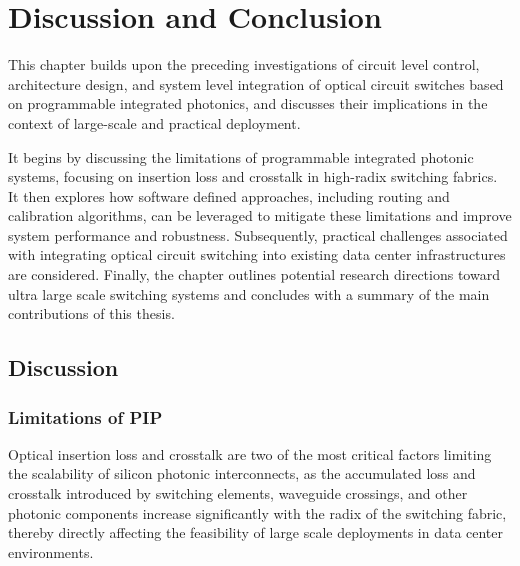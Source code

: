 
\chapter{Discussion and Conclusion}\label{chap:discussion_and_conclusions} %
This chapter builds upon the preceding investigations of circuit level control, architecture design, and system level integration of optical circuit switches based on programmable integrated photonics, and discusses their implications in the context of large-scale and practical deployment.

It begins by discussing the limitations of programmable integrated photonic systems, focusing on insertion loss and crosstalk in high-radix switching fabrics.
It then explores how software defined approaches, including routing and calibration algorithms, can be leveraged to mitigate these limitations and improve system performance and robustness.
Subsequently, practical challenges associated with integrating optical circuit switching into existing data center infrastructures are considered.
Finally, the chapter outlines potential research directions toward ultra large scale switching systems and concludes with a summary of the main contributions of this thesis.
\section{Discussion} \label{section:discussion}
\subsection{Limitations of PIP} \label{subsec:PIP_hardware}
Optical insertion loss and crosstalk are two of the most critical factors limiting the scalability of silicon photonic interconnects,
as the accumulated loss and crosstalk introduced by switching elements, waveguide crossings, and other photonic components increase significantly with the radix of the switching fabric,
thereby directly affecting the feasibility of large scale deployments in data center environments.
